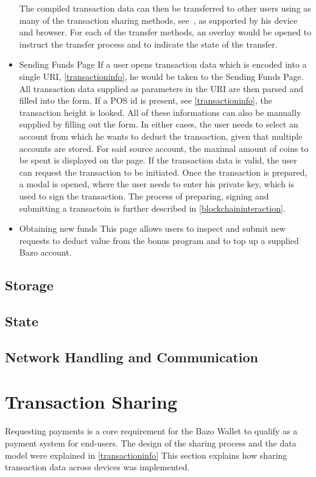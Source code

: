 \begin{itemize}
The compiled transaction data can then be transferred to other users using as many of the transaction sharing methods, see \cite{undefined}, as supported by his device and browser. For each of the transfer methods, an overlay would be opened to instruct the transfer process and to indicate the state of the transfer.
\item Sending Funds Page
If a user opens transaction data which is encoded into a single URI, \ref{transactioninfo}, he would be taken to the Sending Funds Page.
All transaction data supplied as parameters in the URI are then parsed and filled into the form. If a POS id is present, see \ref{transactioninfo}, the transaction height is looked. All of these informations can also be manually supplied by filling out the form. In either cases, the user needs to select an account from which he wants to deduct the transaction, given that multiple accounts are stored. For said source account, the maximal amount of coins to be spent is displayed on the page. If the transaction data is valid, the user can request the transaction to be initiated. Once the transaction is prepared, a modal is opened, where the user needs to enter his private key, which is used to sign the transaction. The process of preparing, signing and submitting a transactoin is further described in \ref{blockchaininteraction}.
\item Obtaining new funds
This page allows users to inspect and submit new requests to deduct value from the bonus program and to top up a supplied Bazo account.
\end{itemize}

\subsection{Storage\label{storage}}
\subsection{State}
\subsection{Network Handling and Communication}

\section{Transaction Sharing}
Requesting payments is a core requirement for the Bazo Wallet to qualify as a payment system for end-users. The design of the sharing process and the data model were explained in \ref{transactioninfo} This section explains how sharing transaction data across devices was implemented.
